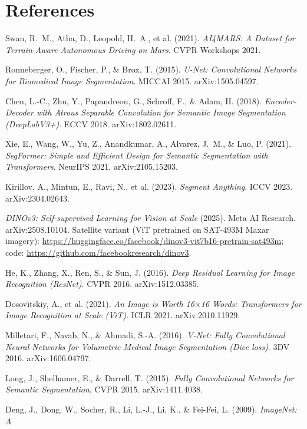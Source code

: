 \documentclass[11pt]{article}
\begin{document}
\section{References}
\begin{enumerate}[leftmargin=2.2em,label={[\arabic*]}]
  \item Swan, R.~M., Atha, D., Leopold, H.~A., et al. (2021). \emph{AI4MARS: A Dataset for
  Terrain-Aware Autonomous Driving on Mars}. CVPR Workshops 2021.
  \item Ronneberger, O., Fischer, P., \& Brox, T. (2015). \emph{U-Net: Convolutional Networks for
  Biomedical Image Segmentation}. MICCAI 2015. arXiv:1505.04597.
  \item Chen, L.-C., Zhu, Y., Papandreou, G., Schroff, F., \& Adam, H. (2018). \emph{Encoder-Decoder
  with Atrous Separable Convolution for Semantic Image Segmentation (DeepLabV3+)}. ECCV 2018.
  arXiv:1802.02611.
  \item Xie, E., Wang, W., Yu, Z., Anandkumar, A., Alvarez, J.~M., \& Luo, P. (2021). \emph{SegFormer:
  Simple and Efficient Design for Semantic Segmentation with Transformers}. NeurIPS 2021.
  arXiv:2105.15203.
  \item Kirillov, A., Mintun, E., Ravi, N., et al. (2023). \emph{Segment Anything}. ICCV 2023.
  arXiv:2304.02643.
  \item \emph{DINOv3: Self-supervised Learning for Vision at Scale} (2025). Meta AI Research.
  arXiv:2508.10104. Satellite variant (ViT pretrained on SAT-493M Maxar imagery):
  \url{https://huggingface.co/facebook/dinov3-vit7b16-pretrain-sat493m}; code:
  \url{https://github.com/facebookresearch/dinov3}.
  \item He, K., Zhang, X., Ren, S., \& Sun, J. (2016). \emph{Deep Residual Learning for Image
  Recognition (ResNet)}. CVPR 2016. arXiv:1512.03385.
  \item Dosovitskiy, A., et al. (2021). \emph{An Image is Worth 16$\times$16 Words: Transformers for
  Image Recognition at Scale (ViT)}. ICLR 2021. arXiv:2010.11929.
  \item Milletari, F., Navab, N., \& Ahmadi, S.-A. (2016). \emph{V-Net: Fully Convolutional Neural
  Networks for Volumetric Medical Image Segmentation (Dice loss)}. 3DV 2016. arXiv:1606.04797.
  \item Long, J., Shelhamer, E., \& Darrell, T. (2015). \emph{Fully Convolutional Networks for
  Semantic Segmentation}. CVPR 2015. arXiv:1411.4038.
  \item Deng, J., Dong, W., Socher, R., Li, L.-J., Li, K., \& Fei-Fei, L. (2009). \emph{ImageNet: A
}
\end{enumerate}
\end{document}
